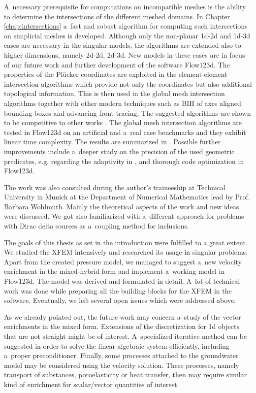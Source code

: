 \documentclass[bibliography=totocnumbered,dvipsnames,FM,Dis, EN]{tulthesis_autoreferat}
\newcommand{\plucker}{Pl\"{u}cker }
\begin{document}
A~necessary prerequisite for computations on incompatible meshes is the ability to determine
the intersections of the different meshed domains. In Chapter \ref{chap:intersections}
a~fast and robust algorithm for computing such intersections on simplicial meshes is developed.
Although only the non-planar 1d-2d and 1d-3d cases are necessary in the singular models,
the algorithms are extended also to higher dimensions, namely 2d-2d, 2d-3d.
New models in these cases are in focus of our future work and further development of the software Flow123d.
The properties of the \plucker coordinates \cite{platis_fast_2003, joswig_plucker_2013} are exploited
in the element-element intersection algorithms which provide not only the coordinates but also additional topological information.
This is then used in the global mesh intersection algorithms together with other modern techniques
such as BIH of axes aligned bounding boxes and advancing front tracing.
The suggested algorithms are shown to be competitive to other works \cite{moller_fast_1997, haines_fast_1991}.
The global mesh intersection algorithms are tested in Flow123d on an artificial and a~real case benchmarks
and they exhibit linear time complexity. The results are summarized in \cite{brezina_2017}.
Possible further improvements include a~deeper study on the precision of the used geometric predicates,
e.g. regarding the adaptivity in \cite{shewchuk_adaptive_1997}, and thorough code optimization in Flow123d.


The work was also consulted during the author's traineeship at Technical University in Munich at the Department of Numerical Mathematics
lead by Prof. Barbara Wohlmuth. Mainly the theoretical aspects of the work and new ideas were discussed.
We got also familiarized with a~different approach for problems with Dirac delta sources \cite{koppl_tum_2015, koppl_vidotto_2018}
as a~coupling method for inclusions.


The goals of this thesis as set in the introduction were fulfilled to a great extent.
We studied the XFEM intensively and researched its usage in singular problems.
Apart from the created pressure model, we managed to suggest a~new velocity enrichment in the mixed-hybrid form
and implement a~working model in Flow123d. The model was derived and formulated in detail.
A~lot of technical work was done while preparing all the building blocks for the XFEM in the software.
Eventually, we left several open issues which were addressed above.

As we already pointed out, the future work may concern a~study of the vector enrichments in the mixed form.
Extensions of the discretization for 1d objects that are not straight might be of interest.
A~specialized iterative method can be suggested in order to solve the linear algebraic system efficiently,
including a~proper preconditioner.
Finally, some processes attached to the groundwater model may be considered using the velocity solution.
These processes, namely transport of substances, poroelasticity or heat transfer, then may require
similar kind of enrichment for scalar/vector quantities of interest. 
\end{document}

